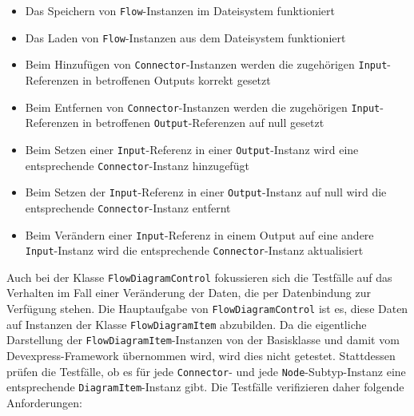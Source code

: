 \begin{itemize}
\item Das Speichern von \texttt{Flow}-Instanzen im Dateisystem funktioniert
\item Das Laden von \texttt{Flow}-Instanzen aus dem Dateisystem funktioniert
\item Beim Hinzufügen von \texttt{Connector}-Instanzen werden die zugehörigen \texttt{Input}-Referenzen in betroffenen Outputs korrekt gesetzt
\item Beim Entfernen von \texttt{Connector}-Instanzen werden die zugehörigen \texttt{Input}-Re\-fe\-ren\-zen in betroffenen \texttt{Output}-Referenzen auf null gesetzt
\item Beim Setzen einer \texttt{Input}-Referenz in einer \texttt{Output}-Instanz wird eine entsprechende \texttt{Connector}-Instanz hinzugefügt
\item Beim Setzen der \texttt{Input}-Referenz in einer \texttt{Output}-Instanz auf null wird die entsprechende \texttt{Connector}-Instanz entfernt
\item Beim Verändern einer \texttt{Input}-Referenz in einem Output auf eine andere \texttt{Input}-Instanz wird die entsprechende \texttt{Connector}-Instanz aktualisiert 

\end{itemize}

\noindent Auch bei der Klasse \texttt{FlowDiagramControl} fokussieren sich die Testfälle auf das Verhalten im Fall einer Veränderung der Daten, die per Datenbindung zur Verfügung stehen. Die Hauptaufgabe von \texttt{FlowDiagramControl} ist es, diese Daten auf Instanzen der Klasse \texttt{FlowDiagramItem} abzubilden. Da die eigentliche Darstellung der \texttt{FlowDiagramItem}-Instanzen von der Basisklasse und damit vom Devexpress-Framework übernommen wird, wird dies nicht getestet. Stattdessen prüfen die Testfälle, ob es für jede \texttt{Connector}- und jede \texttt{Node}-Subtyp-Instanz eine entsprechende \texttt{DiagramItem}-Instanz gibt. Die Testfälle verifizieren daher folgende Anforderungen:

